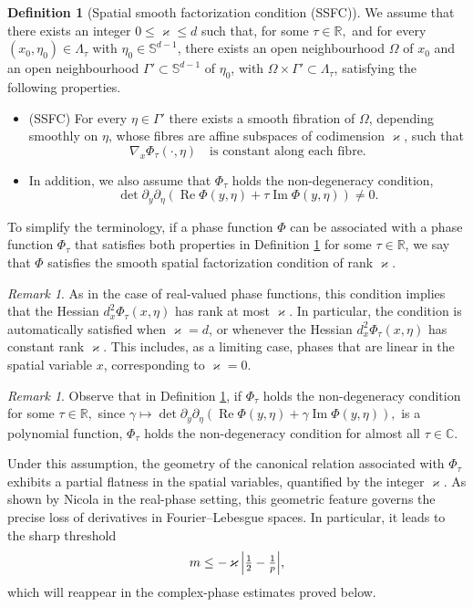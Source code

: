 \documentclass[12pt, reqno]{amsart}
\theoremstyle{definition}
\newtheorem{definition}[theorem]{Definition}
\theoremstyle{remark}
\newtheorem{remark}[theorem]{Remark}
\numberwithin{equation}{section}
\begin{document}
\begin{definition}[Spatial smooth factorization condition (SSFC)]\label{SFC}
We assume that there exists an integer $0\le \varkappa\le d$ such that, for some 
$\tau \in \mathbb{R},$ and for every $(x_0,\eta_0)\in\Lambda_\tau$ with
$\eta_0\in\mathbb{S}^{d-1}$, there exists an open neighbourhood $\Omega$ of $x_0$
and an open neighbourhood $\Gamma'\subset\mathbb{S}^{d-1}$ of $\eta_0$, with
$\Omega\times\Gamma'\subset\Lambda_\tau$, satisfying the following properties.
\begin{itemize}
    \item {{(SSFC)}} For every $\eta\in\Gamma'$ there exists a smooth fibration of $\Omega$,
depending smoothly on $\eta$, whose fibres are affine subspaces of codimension
$\varkappa$, such that
\[
\nabla_x\Phi_\tau(\cdot,\eta)
\quad\text{is constant along each fibre}.
\]
\item In addition, we also  assume that $\Phi_\tau$ holds the non-degeneracy condition,
$$\operatorname{det}\partial_y\partial_{\eta}(\operatorname{Re}\Phi(y,\eta)+\tau\operatorname{Im}\Phi(y,\eta))\neq 0.$$ 
\end{itemize}
To simplify the terminology, if a phase function $\Phi$ can be associated with a phase function $\Phi_\tau$ that satisfies both properties in Definition \ref{SFC} for some $\tau \in \mathbb{R}$, we say that $\Phi$ satisfies the smooth spatial factorization condition of rank $\varkappa$.
\end{definition}
\begin{remark}
    As in the case of real-valued phase functions, this condition implies that the Hessian
$d_x^2\Phi_\tau(x,\eta)$ has rank at most $\varkappa$. In particular, the condition is automatically satisfied when
$\varkappa=d$, or whenever the Hessian $d_x^2\Phi_\tau(x,\eta)$ has constant rank $\varkappa$.
This includes, as a limiting case, phases that are linear in the spatial
variable $x$, corresponding to $\varkappa=0$.
\end{remark}
\begin{remark}
    Observe that in Definition \ref{SFC}, if $\Phi_\tau$ holds the non-degeneracy condition for some $\tau\in \mathbb{R},$ since $\gamma\mapsto\operatorname{det}\partial_y\partial_{\eta}(\operatorname{Re}\Phi(y,\eta)+\gamma\operatorname{Im}\Phi(y,\eta)),$ is a polynomial function, $\Phi_\tau$ holds the non-degeneracy condition  for almost all $\tau\in \mathbb{C}.$
\end{remark}
Under this assumption, the geometry of the canonical relation associated with
$\Phi_\tau$ exhibits a partial flatness in the spatial variables, quantified
by the integer $\varkappa$. As shown by Nicola \cite{Nicola2010} in the real-phase setting, this geometric
feature governs the precise loss of derivatives in Fourier--Lebesgue spaces.
In particular, it leads to the sharp threshold
\[
m \le -\, \varkappa\,\Bigl|\tfrac12-\tfrac1p\Bigr|,
\]
which will reappear in the complex-phase estimates proved below.
\end{document}
